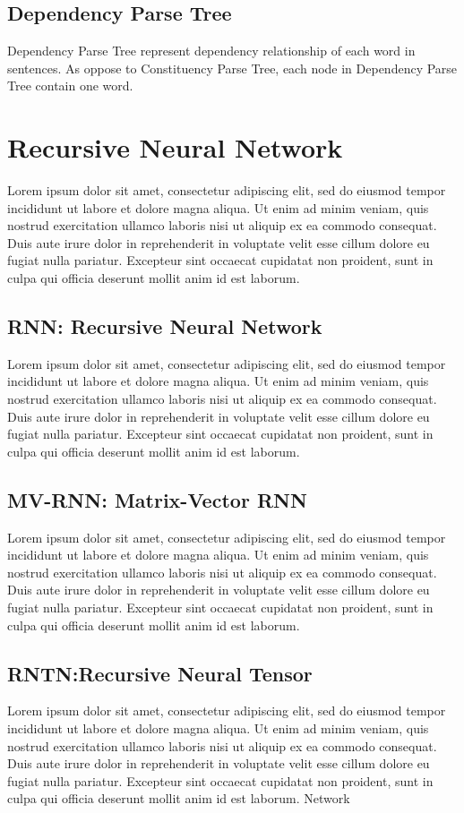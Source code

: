 \subsection{Dependency Parse Tree}
Dependency Parse Tree represent dependency relationship of each word in sentences. As oppose to Constituency Parse Tree, each node in Dependency Parse Tree contain one word.


\section{Recursive Neural Network}
Lorem ipsum dolor sit amet, consectetur adipiscing elit, sed do eiusmod tempor incididunt ut labore et dolore magna aliqua. Ut enim ad minim veniam, quis nostrud exercitation ullamco laboris nisi ut aliquip ex ea commodo consequat. Duis aute irure dolor in reprehenderit in voluptate velit esse cillum dolore eu fugiat nulla pariatur. Excepteur sint occaecat cupidatat non proident, sunt in culpa qui officia deserunt mollit anim id est laborum.
\subsection{RNN: Recursive Neural Network}
Lorem ipsum dolor sit amet, consectetur adipiscing elit, sed do eiusmod tempor incididunt ut labore et dolore magna aliqua. Ut enim ad minim veniam, quis nostrud exercitation ullamco laboris nisi ut aliquip ex ea commodo consequat. Duis aute irure dolor in reprehenderit in voluptate velit esse cillum dolore eu fugiat nulla pariatur. Excepteur sint occaecat cupidatat non proident, sunt in culpa qui officia deserunt mollit anim id est laborum.
\subsection{MV-RNN: Matrix-Vector RNN}
Lorem ipsum dolor sit amet, consectetur adipiscing elit, sed do eiusmod tempor incididunt ut labore et dolore magna aliqua. Ut enim ad minim veniam, quis nostrud exercitation ullamco laboris nisi ut aliquip ex ea commodo consequat. Duis aute irure dolor in reprehenderit in voluptate velit esse cillum dolore eu fugiat nulla pariatur. Excepteur sint occaecat cupidatat non proident, sunt in culpa qui officia deserunt mollit anim id est laborum.
\subsection{RNTN:Recursive Neural Tensor}
Lorem ipsum dolor sit amet, consectetur adipiscing elit, sed do eiusmod tempor incididunt ut labore et dolore magna aliqua. Ut enim ad minim veniam, quis nostrud exercitation ullamco laboris nisi ut aliquip ex ea commodo consequat. Duis aute irure dolor in reprehenderit in voluptate velit esse cillum dolore eu fugiat nulla pariatur. Excepteur sint occaecat cupidatat non proident, sunt in culpa qui officia deserunt mollit anim id est laborum. Network
